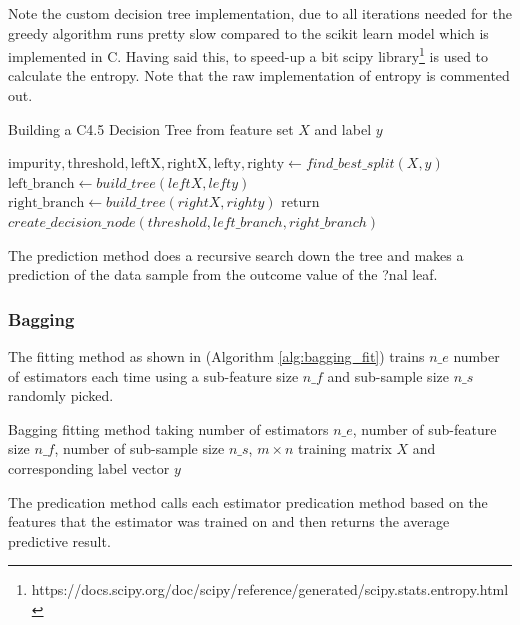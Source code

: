 \documentclass{article}[paper=a4,pagesize=auto,10pt]
\begin{document}
Note the custom decision tree implementation, due to all iterations needed for the greedy algorithm runs pretty slow compared to the scikit learn model which is implemented in C. Having said this, to speed-up a bit scipy library\footnote{https://docs.scipy.org/doc/scipy/reference/generated/scipy.stats.entropy.html} is used to calculate the entropy. Note that the raw implementation of entropy is commented out.\medskip

\begin{algorithm}[]
 \caption{Building a C4.5 Decision Tree from feature set $X$ and label $y$}
 
 $\textrm{impurity}, \textrm{threshold}, \textrm{leftX}, \textrm{rightX}, \textrm{lefty}, \textrm{righty} \gets find\_best\_split({X, y})$\;
 $\textrm{left\_branch} \gets build\_tree(leftX, lefty)$\;
 $\textrm{right\_branch} \gets build\_tree(rightX, righty)$\;
 return $create\_decision\_node(threshold, left\_branch, right\_branch)$\; 
 \label{alg:build_tree}
\end{algorithm}\smallskip


The prediction method does a recursive search down the tree and makes a prediction of the data sample from the outcome value of the ?nal leaf.\medskip

\subsubsection{Bagging} \label{imp_bagging}

The fitting method as shown in (Algorithm \ref{alg:bagging_fit}) trains $n\_e$ number of estimators each time using a sub-feature size $n\_f$ and sub-sample size $n\_s$ randomly picked.\medskip

\begin{algorithm}[]
 \caption{Bagging fitting method taking number of estimators $n\_e$, number of sub-feature size $n\_f$, number of sub-sample size $n\_s$, $m \times n$ training matrix $X$ and corresponding label vector $y$}
 \label{alg:bagging_fit}
\end{algorithm}\smallskip

The predication method calls each estimator predication method based on the features that the estimator was trained on and then returns the average predictive result.
\end{document}
